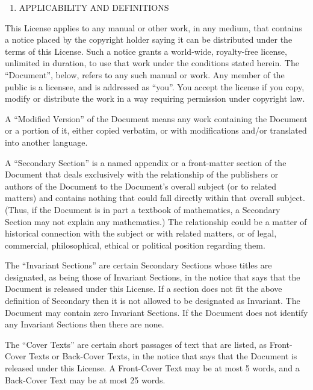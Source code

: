\documentclass[12pt,a4paperpaper,]{report}
\providecommand{\tightlist}{%
  \setlength{\itemsep}{0pt}\setlength{\parskip}{0pt}}
\begin{document}
\begin{enumerate}
\def\labelenumi{\arabic{enumi}.}
\tightlist
\item
  APPLICABILITY AND DEFINITIONS
\end{enumerate}

This License applies to any manual or other work, in any medium, that
contains a notice placed by the copyright holder saying it can be
distributed under the terms of this License. Such a notice grants a
world-wide, royalty-free license, unlimited in duration, to use that
work under the conditions stated herein. The ``Document'', below, refers
to any such manual or work. Any member of the public is a licensee, and
is addressed as ``you''. You accept the license if you copy, modify or
distribute the work in a way requiring permission under copyright law.

A ``Modified Version'' of the Document means any work containing the
Document or a portion of it, either copied verbatim, or with
modifications and/or translated into another language.

A ``Secondary Section'' is a named appendix or a front-matter section of
the Document that deals exclusively with the relationship of the
publishers or authors of the Document to the Document's overall subject
(or to related matters) and contains nothing that could fall directly
within that overall subject. (Thus, if the Document is in part a
textbook of mathematics, a Secondary Section may not explain any
mathematics.) The relationship could be a matter of historical
connection with the subject or with related matters, or of legal,
commercial, philosophical, ethical or political position regarding them.

The ``Invariant Sections'' are certain Secondary Sections whose titles
are designated, as being those of Invariant Sections, in the notice that
says that the Document is released under this License. If a section does
not fit the above definition of Secondary then it is not allowed to be
designated as Invariant. The Document may contain zero Invariant
Sections. If the Document does not identify any Invariant Sections then
there are none.

The ``Cover Texts'' are certain short passages of text that are listed,
as Front-Cover Texts or Back-Cover Texts, in the notice that says that
the Document is released under this License. A Front-Cover Text may be
at most 5 words, and a Back-Cover Text may be at most 25 words.
\end{document}
